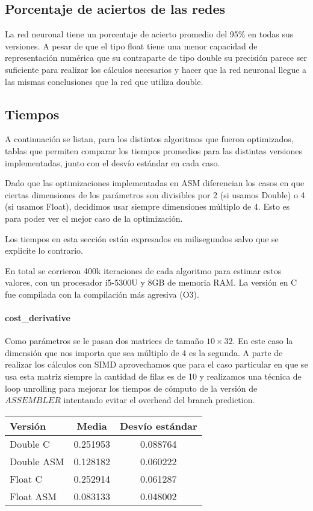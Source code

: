 \subsection{Porcentaje de aciertos de las redes}

La red neuronal tiene un porcentaje de acierto promedio del 95\% en todas sus versiones. A pesar de que el tipo float tiene una menor capacidad de representación numérica que su contraparte de tipo double su precisión parece ser suficiente para realizar los cálculos necesarios y hacer que la red neuronal llegue a las mismas conclusiones que la red que utiliza double.

\subsection{Tiempos}

A continuación se listan, para los distintos algoritmos que fueron optimizados, tablas que permiten comparar los tiempos promedios para las distintas versiones implementadas, junto con el desvío estándar en cada caso.

Dado que las optimizaciones implementadas en ASM diferencian los casos en que ciertas dimensiones de los parámetros son divisibles por 2 (si usamos Double) o 4 (si usamos Float), decidimos usar siempre dimensiones múltiplo de 4. Esto es para poder ver el mejor caso de la optimización.

Los tiempos en esta sección están expresados en milisegundos salvo que se explicite lo contrario.

En total se corrieron 400k iteraciones de cada algoritmo para estimar estos valores, con un procesador i5-5300U y 8GB de memoria RAM. La versión en C fue compilada con la compilación más agresiva (O3).

\paragraph{cost\_derivative}

Como parámetros se le pasan dos matrices de tamaño $10\times32$. En este caso la dimensión que nos importa que sea múltiplo de 4 es la segunda. A parte de realizar los cálculos con SIMD aprovechamos que para el caso particular en que se usa esta matriz siempre la cantidad de filas es de 10 y realizamos una técnica de loop unrolling para mejorar los tiempos de cómputo de la versión de $ASSEMBLER$ intentando evitar el overhead del branch prediction.

\begin{center}
    \begin{tabular}{| l | c | c |}
                \hline
    Versión & Media & Desvío estándar \\
                \hline
    Double C & 0.251953 & 0.088764 \\
    Double ASM & 0.128182 & 0.060222 \\
    Float C & 0.252914 & 0.061287 \\
    Float ASM  & 0.083133 & 0.048002 \\
                \hline
			
        \end{tabular}
\end{center}

